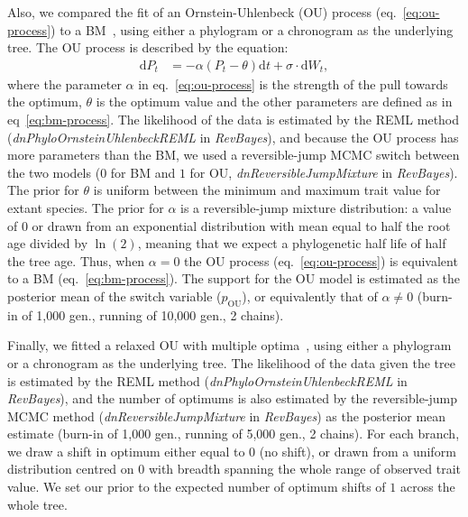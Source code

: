 \documentclass{article}
\newcommand{\Multiply}{\cdot}
\newcommand{\der}{\mathrm{d}}
\newcommand{\Trait}{P}
\begin{document}
Also, we compared the fit of an Ornstein-Uhlenbeck (OU) process (eq.~\ref{eq:ou-process}) to a BM~\citep{hansen_stabilizing_1997,butler_phylogenetic_2004}, using either a phylogram or a chronogram as the underlying tree.
The OU process is described by the equation:
\begin{align}
    \der \Trait_t & = -\alpha \left( \Trait_t - \theta \right) \der t + \sigma \Multiply \der W_t, \label{eq:ou-process}
\end{align}
where the parameter $\alpha$ in eq.~\ref{eq:ou-process} is the strength of the pull towards the optimum, $\theta$ is the optimum value and the other parameters are defined as in eq~\ref{eq:bm-process}.
The likelihood of the data is estimated by the REML method (\textit{dnPhyloOrnsteinUhlenbeckREML} in \textit{RevBayes}), and because the OU process has more parameters than the BM, we used a reversible-jump MCMC switch between the two models ($0$ for BM and $1$ for OU, \textit{dnReversibleJumpMixture} in \textit{RevBayes}).
The prior for $\theta$ is uniform between the minimum and maximum trait value for extant species.
The prior for $\alpha$ is a reversible-jump mixture distribution: a value of $0$ or drawn from an exponential distribution with mean equal to half the root age divided by $\ln (2)$, meaning that we expect a phylogenetic half life of half the tree age.
Thus, when $\alpha = 0$ the OU process (eq.~\ref{eq:ou-process}) is equivalent to a BM (eq.~\ref{eq:bm-process}).
The support for the OU model is estimated as the posterior mean of the switch variable ($p_{\text{OU}}$), or equivalently that of $\alpha \neq 0$ (burn-in of 1,000 gen., running of 10,000 gen., 2 chains).

Finally, we fitted a relaxed OU with multiple optima~\citep{uyeda_novel_2014}, using either a phylogram or a chronogram as the underlying tree.
The likelihood of the data given the tree is estimated by the REML method (\textit{dnPhyloOrnsteinUhlenbeckREML} in \textit{RevBayes}), and the number of optimums is also estimated by the reversible-jump MCMC method (\textit{dnReversibleJumpMixture} in \textit{RevBayes}) as the posterior mean estimate (burn-in of 1,000 gen., running of 5,000 gen., 2 chains).
For each branch, we draw a shift in optimum either equal to $0$ (no shift), or drawn from a uniform distribution centred on $0$ with breadth spanning the whole range of observed trait value.
We set our prior to the expected number of optimum shifts of $1$ across the whole tree.
\end{document}
